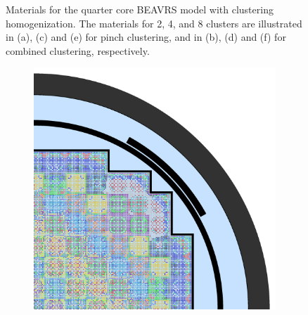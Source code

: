 \begin{figure}[h!]
\begin{subfigure}{0.48\textwidth}
  \caption{}
  \label{fig:chap10-full-core-combined-8}
\end{subfigure}
\caption[Materials for BEAVRS with clustering homogenization (2 -- 8 clusters)]{Materials for the quarter core \ac{BEAVRS} model with clustering homogenization. The materials for 2, 4, and 8 clusters are illustrated in (a), (c) and (e) for pinch clustering, and in (b), (d) and (f) for combined clustering, respectively.}
\label{fig:chap10-full-core-geometries-8}
\end{figure}

\clearpage

\begin{figure}[h!]
\centering
\begin{subfigure}{0.48\textwidth}
  \centering
  \includegraphics[width=0.9\linewidth]{figures/unsupervised/geometries/with-features/16-clusters/pinch/full-core}
  \caption{}
  \label{fig:chap10-full-core-pinch-16}
\end{subfigure}%
\begin{subfigure}{0.48\textwidth}
  \centering

\end{subfigure}
\end{figure}
